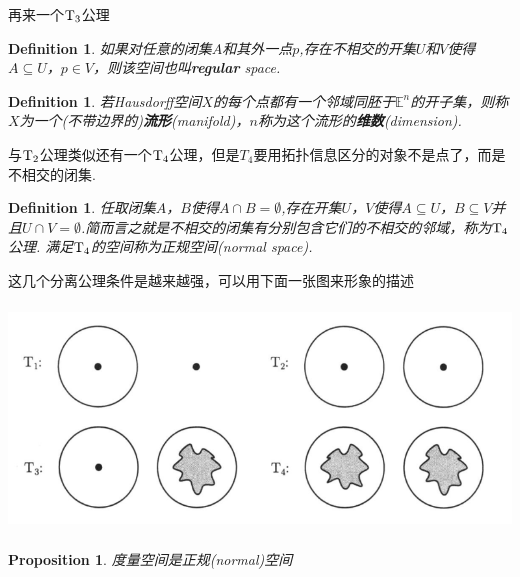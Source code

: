 \documentclass{article}
\newtheorem{proposition}[theorem]{Proposition}
\newtheorem{definition}[theorem]{Definition}
\begin{document}
再来一个$\rm T_3$公理

\begin{definition}
如果对任意的闭集$A$和其外一点$p$,存在不相交的开集$U$和$V$使得$A \subseteq U$，$p \in V$，则该空间也叫\rm \textbf{regular} space.
\end{definition}

\begin{definition}
若\rm Hausdorff空间$X$的每个点都有一个邻域同胚于$\mathbb{E}^n$的开子集，则称$X$为一个(不带边界的)\textbf{流形}(manifold)，$n$称为这个流形的\textbf{维数}(\rm dimension).
\end{definition}


与$\rm T_2$公理类似还有一个$\rm T_4$公理，但是$T_4$要用拓扑信息区分的对象不是点了，而是不相交的闭集.

\begin{definition}
任取闭集$A$，$B$使得$A \cap B = \emptyset$,存在开集$U$，$V$使得$A \subseteq U$，$B \subseteq V$并且$U \cap V = \emptyset$.简而言之就是不相交的闭集有分别包含它们的不相交的邻域，称为$\rm T_4$公理. 满足$\rm T_4$的空间称为\textsf{正规空间}(\rm normal space).
\end{definition}

这几个分离公理条件是越来越强，可以用下面一张图来形象的描述


\begin{center}
\includegraphics[width=14cm, height=6cm]{images/separation-axiom.png}
\end{center}


\begin{proposition}
度量空间是正规(normal)空间
\end{proposition}
\end{document}
